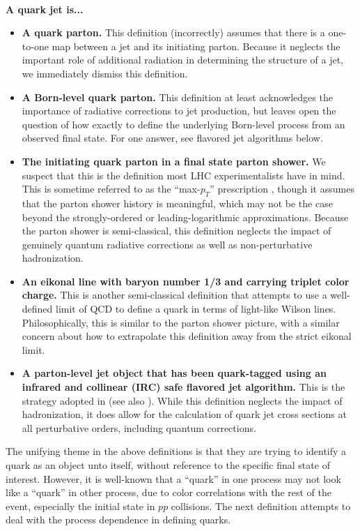 \documentclass[11pt,letterpaper]{article}
\begin{document}
~\\
\noindent \textbf{A quark jet is...}
\begin{itemize}
\item \textbf{A quark parton.}  This definition (incorrectly) assumes that there is a one-to-one map between a jet and its initiating parton.  Because it neglects the important role of additional radiation in determining the structure of a jet, we immediately dismiss this definition.
\item \textbf{A Born-level quark parton.}  This definition at least acknowledges the importance of radiative corrections to jet production, but leaves open the question of how exactly to define the underlying Born-level process from an observed final state.  For one answer, see flavored jet algorithms below.
\item \textbf{The initiating quark parton in a final state parton shower.}  We suspect that this is the definition most LHC experimentalists have in mind.  This is sometime referred to as the ``max-$p_T$'' prescription \cite{}, though it assumes that the parton shower history is meaningful, which may not be the case beyond the strongly-ordered or leading-logarithmic approximations.  Because the parton shower is semi-classical, this definition neglects the impact of genuinely quantum radiative corrections as well as non-perturbative hadronization. 
\item \textbf{An eikonal line with baryon number 1/3 and carrying triplet color charge.}  This is another semi-classical definition that attempts to use a well-defined limit of QCD to define a quark in terms of light-like Wilson lines.  Philosophically, this is similar to the parton shower picture, with a similar concern about how to extrapolate this definition away from the strict eikonal limit.
\item \textbf{A parton-level jet object that has been quark-tagged using an infrared and collinear (IRC) safe flavored jet algorithm.}  This is the strategy adopted in \cite{} (see also \cite{}).  While this definition neglects the impact of hadronization, it does allow for the calculation of quark jet cross sections at all perturbative orders, including quantum corrections.
\end{itemize}
The unifying theme in the above definitions is that they are trying to identify a quark as an object unto itself, without reference to the specific final state of interest.  However, it is well-known that a ``quark'' in one process may not look like a ``quark'' in other process, due to color correlations with the rest of the event, especially the initial state in $pp$ collisions.  The next definition attempts to deal with the process dependence in defining quarks. 
\end{document}
